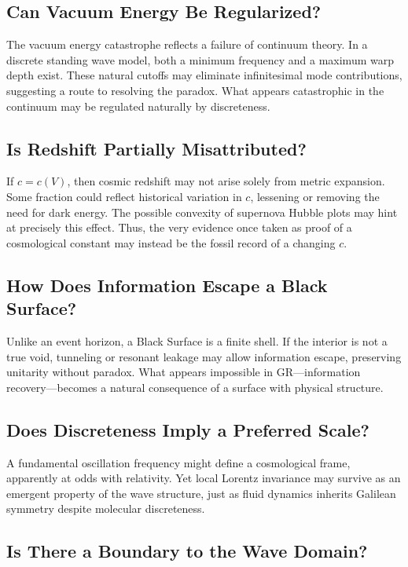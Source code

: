 \documentclass[12pt]{article}
\begin{document}
\subsection{Can Vacuum Energy Be Regularized?}

The vacuum energy catastrophe reflects a failure of continuum theory. In a discrete standing wave model, both a minimum frequency and a maximum warp depth exist. These natural cutoffs may eliminate infinitesimal mode contributions, suggesting a route to resolving the paradox. What appears catastrophic in the continuum may be regulated naturally by discreteness.

\subsection{Is Redshift Partially Misattributed?}

If $c = c(V)$, then cosmic redshift may not arise solely from metric expansion. Some fraction could reflect historical variation in $c$, lessening or removing the need for dark energy. The possible convexity of supernova Hubble plots may hint at precisely this effect. Thus, the very evidence once taken as proof of a cosmological constant may instead be the fossil record of a changing $c$.

\subsection{How Does Information Escape a Black Surface?}

Unlike an event horizon, a Black Surface is a finite shell. If the interior is not a true void, tunneling or resonant leakage may allow information escape, preserving unitarity without paradox. What appears impossible in GR---information recovery---becomes a natural consequence of a surface with physical structure.

\subsection{Does Discreteness Imply a Preferred Scale?}

A fundamental oscillation frequency might define a cosmological frame, apparently at odds with relativity. Yet local Lorentz invariance may survive as an emergent property of the wave structure, just as fluid dynamics inherits Galilean symmetry despite molecular discreteness.

\subsection{Is There a Boundary to the Wave Domain?}
\end{document}
